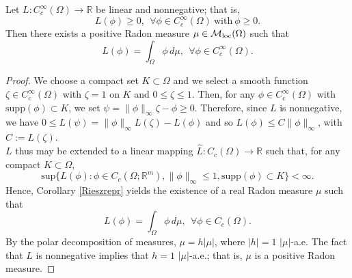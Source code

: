 \begin{lemma} \label{Schwartzlemma} Let $L : C^{\infty}_{c}(\Omega) \to \mathbb{R}$ be linear and nonnegative; that is, 
\[L(\phi) \ge 0, \ \ \forall \phi \in C^{\infty}_{c}(\Omega) \ \text{with} \ \phi \ge 0.\] 
Then there exists a positive Radon measure $\mu \in \mathcal{M}_{\rm loc}(\Omega)$ such that
\[ L(\phi) = \int_{\Omega} \phi \, d \mu, \ \ \forall \phi \in C^{\infty}_{c}(\Omega). \]
\end{lemma}
\begin{proof} We choose a compact set $K \subset \Omega$ and we select a smooth function $\zeta \in C^{\infty}_{c}(\Omega)$ with $\zeta = 1$ on $K$ and $0 \le \zeta \le 1$. Then, for any $\phi \in C^{\infty}_{c}(\Omega)$ with $\mathrm{supp}(\phi) \subset K$, we set $\psi = \|\phi\|_{\infty} \zeta - \phi \ge 0$. Therefore, since $L$ is nonnegative, we have $0 \le L(\psi) = \|\phi\|_{\infty} L(\zeta) - L(\phi)$ and so $L(\phi) \le C \|\phi\|_{\infty}$, with $C := L(\zeta)$.
\\
$L$ thus may be extended to a linear mapping $\hat{L} : C_{c}(\Omega) \to \mathbb{R}$ such that, for any compact $K \subset \Omega$, 
\[ \mathrm{sup} \{ L(\phi) : \phi \in C_{c} (\Omega; \mathbb{R}^{m}), \|\phi\|_{\infty} \le 1, \mathrm{supp}(\phi) \subset K \} < \infty. \]
Hence, Corollary \ref{Rieszrepr} yields the existence of a real Radon measure $\mu$ such that
\[ L(\phi) = \int_{\Omega} \phi \, d \mu, \ \ \forall \phi \in C_{c}(\Omega). \]
By the polar decomposition of measures, $\mu = h |\mu|$, where $|h| = 1$ $|\mu|$-a.e. The fact that $L$ is nonnegative implies that $h = 1$ $|\mu|$-a.e.; that is, $\mu$ is a positive Radon measure. 
\end{proof}

